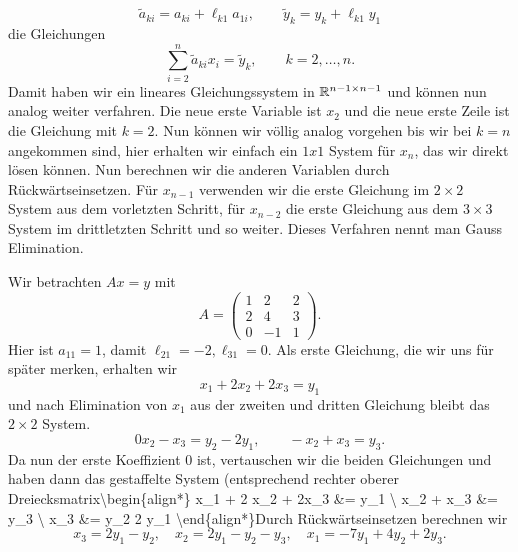 \begin{equation*}
\tilde a_{ki} = a_{ki} + \ell_{k1} a_{1i}, \qquad \tilde y_k = y_k + \ell_{k1} y_1
\end{equation*}
die Gleichungen
\begin{equation*}
 \sum_{i=2}^n \tilde a_{ki} x_i = \tilde y_k, \qquad k=2,\ldots,n.
\end{equation*}
Damit haben wir ein lineares Gleichungssystem in \(\mathbb{R}^{n-1 \times n-1}\) und können nun analog weiter verfahren. Die neue erste Variable ist \(x_2\) und die neue erste Zeile ist die Gleichung mit \(k=2\). Nun können wir völlig analog vorgehen bis wir bei \(k=n\) angekommen sind, hier erhalten wir einfach ein \(1x1\) System für \(x_n\), das wir direkt lösen können. Nun berechnen wir die anderen Variablen durch Rückwärtseinsetzen. Für \(x_{n-1}\) verwenden wir die erste Gleichung im \(2 \times 2\) System aus dem vorletzten Schritt, für \(x_{n-2}\) die erste Gleichung aus dem \(3 \times 3\) System im drittletzten Schritt und so weiter.  Dieses Verfahren nennt man Gauss Elimination.
\label{vektorraeume/LGS:example-20}
\begin{example}{}{}



Wir betrachten \(Ax=y\) mit
\begin{equation*}
 A = \left( \begin{matrix} 1 & 2 & 2 \\ 2 & 4 & 3 \\ 0 & -1 & 1 \end{matrix} \right).
\end{equation*}
Hier ist \(a_{11}=1\), damit \(\ell_{21} = -2, \ell_{31} = 0. \) Als erste Gleichung, die wir uns für später merken, erhalten wir
\begin{equation*}
 x_1 + 2 x_2 + 2x_3 = y_1
\end{equation*}
und nach Elimination von \(x_1\) aus der zweiten und dritten Gleichung bleibt das \(2 \times 2 \) System.
\begin{equation*}
 0 x_2 -x_3 = y_2 -2 y_1, \qquad -x_2 + x_3 = y_3.
\end{equation*}
Da nun der erste Koeffizient \(0\) ist, vertauschen wir die beiden Gleichungen und haben dann das gestaffelte System (entsprechend rechter oberer Dreiecksmatrix\textbackslash{}begin\{align*\}
x\_1 + 2 x\_2 + 2x\_3 \&= y\_1 \textbackslash{}  x\_2 + x\_3 \&= y\_3 \textbackslash{}
 x\_3 \&= y\_2  2 y\_1
\textbackslash{}end\{align*\}Durch Rückwärtseinsetzen berechnen wir
\begin{equation*}
 x_3=2y_1 - y_2, \quad x_2 = 2 y_1 -y_2 -y_3, \quad x_1 = - 7 y_1 + 4y_2 +2 y_3.
\end{equation*}\end{example}

